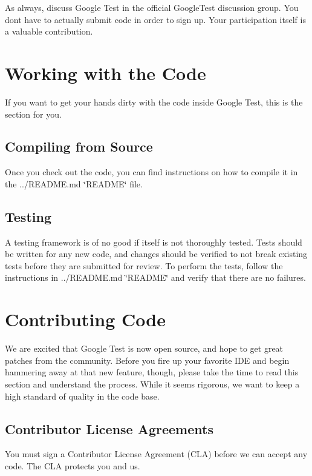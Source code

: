 As always, discuss Google Test in the official Google\+Test discussion group. You don\textquotesingle{}t have to actually submit code in order to sign up. Your participation itself is a valuable contribution.

\section*{Working with the Code}

If you want to get your hands dirty with the code inside Google Test, this is the section for you.

\subsection*{Compiling from Source}

Once you check out the code, you can find instructions on how to compile it in the ../\+R\+E\+A\+D\+ME.md \char`\"{}\+R\+E\+A\+D\+M\+E\char`\"{} file.

\subsection*{Testing}

A testing framework is of no good if itself is not thoroughly tested. Tests should be written for any new code, and changes should be verified to not break existing tests before they are submitted for review. To perform the tests, follow the instructions in ../\+R\+E\+A\+D\+ME.md \char`\"{}\+R\+E\+A\+D\+M\+E\char`\"{} and verify that there are no failures.

\section*{Contributing Code}

We are excited that Google Test is now open source, and hope to get great patches from the community. Before you fire up your favorite I\+DE and begin hammering away at that new feature, though, please take the time to read this section and understand the process. While it seems rigorous, we want to keep a high standard of quality in the code base.

\subsection*{Contributor License Agreements}

You must sign a Contributor License Agreement (C\+LA) before we can accept any code. The C\+LA protects you and us.


